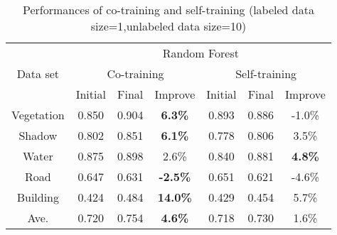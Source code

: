 \documentclass{article}
\begin{document}
\begin{table}[]
\begin{center}
\begin{tabular}{c|ccc|ccc}
\toprule
\multirow{3}{*}{Data set} & \multicolumn{6}{c}{Random Forest}                                  \\
\cline{2-7}
                          & \multicolumn{3}{c|}{Co-training}      & \multicolumn{3}{c}{Self-training} \\
\cline{2-7}
                          & Initial & Final & Improve         & Initial   & Final   & Improve  \\
\midrule
Vegetation                & 0.850    & 0.904  & \textbf{6.3\%}   & 0.893      & 0.886    & -1.0\%   \\
Shadow                    & 0.802    & 0.851  & \textbf{6.1\%}   & 0.778      & 0.806    & 3.5\%   \\
Water                     & 0.875    & 0.898  & 2.6\%            & 0.840      & 0.881    & \textbf{4.8\%}   \\
Road                      & 0.647    & 0.631  & \textbf{-2.5\%}  & 0.651      & 0.621    & -4.6\%    \\
Building                  & 0.424    & 0.484  & \textbf{14.0\%}  & 0.429      & 0.454    & 5.7\%    \\
\midrule
Ave.                      & 0.720    & 0.754  & \textbf{4.6\%}   & 0.718      & 0.730    & 1.6\%   \\
\bottomrule
\end{tabular}
\caption{Performances of co-training and self-training (labeled data size=1,unlabeled data size=10)}
\end{center}
\end{table}
\end{document}
